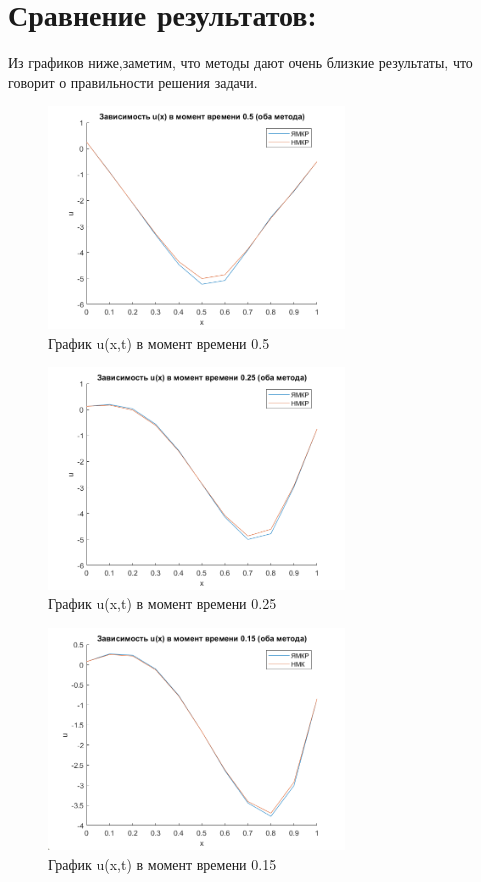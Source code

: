 \documentclass[]{article}
\begin{document}
	\section*{Сравнение результатов:}
	Из графиков ниже,заметим, что методы дают очень близкие результаты, что говорит о правильности решения задачи.\\
	\begin{figure}[H]
		\centering
		\includegraphics[width=0.7\textwidth]{zav05}
		\caption{График u(x,t) в момент времени 0.5}
		\label{pиc5}
	\end{figure}
	\begin{figure}[H]
		\centering
		\includegraphics[width=0.7\textwidth]{zav025}
		\caption{График u(x,t) в момент времени 0.25}
		\label{pиc6}
	\end{figure}
	\begin{figure}[H]
		\centering
		\includegraphics[width=0.7\textwidth]{zav015}
		\caption{График u(x,t) в момент времени 0.15}
		\label{pиc7}
	\end{figure}
\newpage
\end{document}
